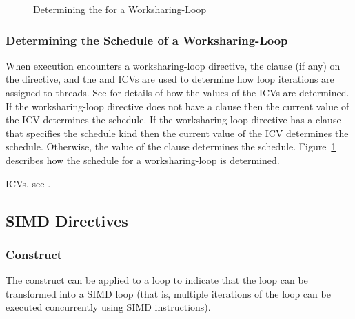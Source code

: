 \begin{figure}[h]
\begin{quote} %

\end{quote}
\caption{Determining the  for a Worksharing-Loop\label{fig:schedule loop}}
\end{figure}



\subsubsection{Determining the Schedule of a Worksharing-Loop}
\label{subsubsec:Determining the Schedule of a Worksharing-Loop}
When execution encounters a worksharing-loop directive, the  
clause (if any) on the directive, and the  and 
 ICVs are used to determine how loop iterations are 
assigned to threads. See  for 
details of how the values of the ICVs are determined. If the worksharing-loop 
directive does not have a  clause then the current value of 
the \mbox{} ICV determines the schedule. If the 
worksharing-loop directive has a  clause that specifies 
the  schedule kind then the current value of the 
 ICV determines the schedule. Otherwise, the
value of the  clause determines the schedule. 
Figure~\ref{fig:schedule loop} describes how the schedule for a 
worksharing-loop is determined.

\begin{crossrefs}
\item ICVs, see .
\end{crossrefs}



\subsection{SIMD Directives}
\label{subsec:SIMD Directives}

\subsubsection{ Construct}
\label{subsubsec:simd Construct}
\summary
The  construct can be applied to a loop to indicate that the loop 
can be transformed into a SIMD loop (that is, multiple iterations of the loop 
can be executed concurrently using SIMD instructions).

